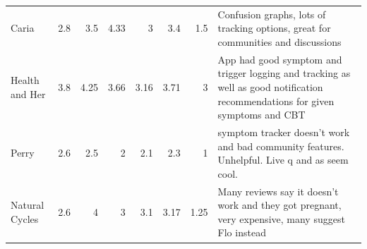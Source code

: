 \begin{table}[]
\begin{tabular}{lrrrr
    >{\columncolor[HTML]{EFEFEF}}r 
    >{\columncolor[HTML]{EFEFEF}}r l}
    Caria                        & 2.8                                     & 3.5                                        & 4.33                                    & 3                                        & 3.4                                                              & 1.5                                                             & Confusion graphs, lots of tracking options, great for communities and discussions                                                                                                                                                                                                                                                                                                          \\
    Health and Her               & 3.8                                     & 4.25                                       & 3.66                                    & 3.16                                     & 3.71                                                             & 3                                                               & App had good symptom and trigger logging and tracking as well as good notification recommendations for given symptoms and CBT                                                                                                                                                                                                                                                              \\
    Perry                        & 2.6                                     & 2.5                                        & 2                                       & 2.1                                      & 2.3                                                              & 1                                                               & symptom tracker doesn’t work and bad community features. Unhelpful. Live q and as seem cool.                                                                                                                                                                                                                                                                                               \\
    Natural Cycles               & 2.6                                     & 4                                          & 3                                       & 3.1                                      & 3.17                                                             & 1.25                                                            & Many reviews say it doesn't work and they got pregnant, very expensive, many suggest Flo instead                                                                                                                                                                                                                                                                                           \\

\end{tabular}
\end{table}
